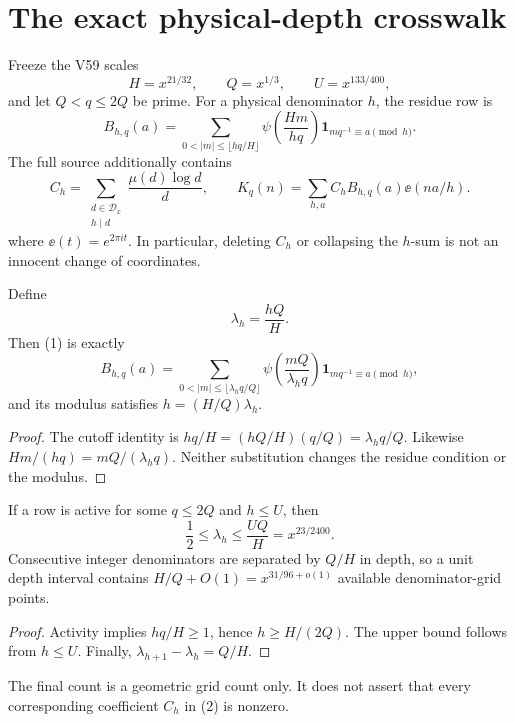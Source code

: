 \section{The exact physical-depth crosswalk}

Freeze the V59 scales
\[
 H=x^{21/32},\qquad Q=x^{1/3},\qquad U=x^{133/400},
\]
and let $Q<q\le 2Q$ be prime.  For a physical denominator $h$, the residue row is
\begin{equation}
 B_{h,q}(a)=
 \sum_{0<|m|\le\lfloor hq/H\rfloor}
 \psi\!\left(\frac{Hm}{hq}\right)
 \mathbf 1_{m q^{-1}\equiv a\pmod h}.                 \label{eq:physical-row}
\end{equation}
The full source additionally contains
\begin{equation}
 C_h=\sum_{\substack{d\in\mathcal D_x\\h\mid d}}
 \frac{\mu(d)\log d}{d},\qquad
 K_q(n)=\sum_{h,a}C_hB_{h,q}(a)\ee(na/h).             \label{eq:full-source}
\end{equation}
where $\ee(t)=e^{2\pi it}$.  In particular, deleting $C_h$ or collapsing the $h$-sum
is not an innocent change of coordinates.

\begin{theorem}\label{thm:crosswalk}
Define
\[
 \lambda_h=\frac{hQ}{H}.
\]
Then (1) is exactly
\begin{equation}
 B_{h,q}(a)=
 \sum_{0<|m|\le\lfloor\lambda_hq/Q\rfloor}
 \psi\!\left(\frac{mQ}{\lambda_hq}\right)
 \mathbf 1_{m q^{-1}\equiv a\pmod h},                \label{eq:depth-row}
\end{equation}
and its modulus satisfies $h=(H/Q)\lambda_h$.
\end{theorem}

\begin{proof}
The cutoff identity is
$hq/H=(hQ/H)(q/Q)=\lambda_hq/Q$.  Likewise
$Hm/(hq)=mQ/(\lambda_hq)$.  Neither substitution changes the residue condition or
the modulus.
\end{proof}

\begin{corollary}\label{cor:range}
If a row is active for some $q\le2Q$ and $h\le U$, then
\[
 \frac12\le\lambda_h\le\frac{UQ}{H}=x^{23/2400}.
\]
Consecutive integer denominators are separated by $Q/H$ in depth, so a unit depth
interval contains $H/Q+O(1)=x^{31/96+o(1)}$ available denominator-grid points.
\end{corollary}

\begin{proof}
Activity implies $hq/H\ge1$, hence $h\ge H/(2Q)$.  The upper bound follows from
$h\le U$.  Finally, $\lambda_{h+1}-\lambda_h=Q/H$.
\end{proof}

The final count is a geometric grid count only.  It does not assert that every
corresponding coefficient $C_h$ in (2) is nonzero.
